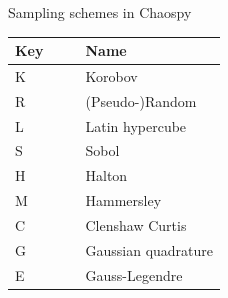 \documentclass[handout]{beamer}
\begin{document}
\begin{frame}{Sampling schemes in Chaospy}
\begin{center}


  \begin{tabular}{llll}
   Key & & &  Name            \\\hline
     K & & &  Korobov            \\
     R & & &  (Pseudo-)Random   \\
     L & & &  Latin hypercube    \\
     S & & &  Sobol              \\
     H & & &  Halton             \\
     M & & &  Hammersley        \\\hline
     C & & &  Clenshaw Curtis   \\
     G & & &  Gaussian quadrature\\
     E & & &  Gauss-Legendre\\\hline
  \end{tabular}

\end{center}

\end{frame}
\end{document}
